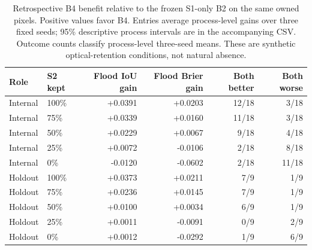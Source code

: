 \begin{table}[H]
\caption{Retrospective B4 benefit relative to the frozen S1-only B2 on the same owned pixels. Positive values favor B4. Entries average process-level gains over three fixed seeds; 95\% descriptive process intervals are in the accompanying CSV. Outcome counts classify process-level three-seed means. These are synthetic optical-retention conditions, not natural absence.}
\label{tab:opticalbenefit}
\centering\small
\setlength{\tabcolsep}{5pt}
\renewcommand{\arraystretch}{1.15}
\begin{tabular}{@{}llrrrr@{}}
\hline
Role & S2 kept & Flood IoU gain & Flood Brier gain & Both better & Both worse \\
\hline
Internal & 100\% & +0.0391 & +0.0203 & 12/18 & 3/18 \\
Internal & 75\% & +0.0339 & +0.0160 & 11/18 & 3/18 \\
Internal & 50\% & +0.0229 & +0.0067 & 9/18 & 4/18 \\
Internal & 25\% & +0.0072 & -0.0106 & 2/18 & 8/18 \\
Internal & 0\% & -0.0120 & -0.0602 & 2/18 & 11/18 \\
\hline
Holdout & 100\% & +0.0373 & +0.0211 & 7/9 & 1/9 \\
Holdout & 75\% & +0.0236 & +0.0145 & 7/9 & 1/9 \\
Holdout & 50\% & +0.0100 & +0.0034 & 6/9 & 1/9 \\
Holdout & 25\% & +0.0011 & -0.0091 & 0/9 & 2/9 \\
Holdout & 0\% & +0.0012 & -0.0292 & 1/9 & 6/9 \\
\hline
\end{tabular}
\end{table}
